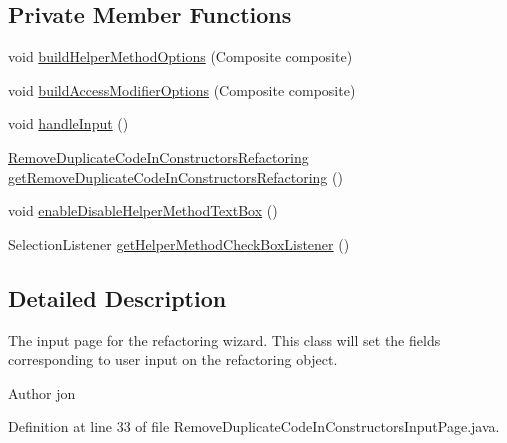 \subsection*{Private Member Functions}
\begin{DoxyCompactItemize}
\item 
void \hyperlink{classedu_1_1illinois_1_1canistelCassabanana_1_1RemoveDuplicateCodeInConstructorsInputPage_a9d523dfb5ee2d5cc7291b443ae27f48e}{buildHelperMethodOptions} (Composite composite)
\item 
void \hyperlink{classedu_1_1illinois_1_1canistelCassabanana_1_1RemoveDuplicateCodeInConstructorsInputPage_a10d164d3a8635fec5038274620a1ad58}{buildAccessModifierOptions} (Composite composite)
\item 
void \hyperlink{classedu_1_1illinois_1_1canistelCassabanana_1_1RemoveDuplicateCodeInConstructorsInputPage_a240da4f4f9c7d6a035752c09e159a0cc}{handleInput} ()
\item 
\hyperlink{classedu_1_1illinois_1_1canistelCassabanana_1_1RemoveDuplicateCodeInConstructorsRefactoring}{RemoveDuplicateCodeInConstructorsRefactoring} \hyperlink{classedu_1_1illinois_1_1canistelCassabanana_1_1RemoveDuplicateCodeInConstructorsInputPage_a90f01a38343d273b9f0e74308fdb50d8}{getRemoveDuplicateCodeInConstructorsRefactoring} ()
\item 
void \hyperlink{classedu_1_1illinois_1_1canistelCassabanana_1_1RemoveDuplicateCodeInConstructorsInputPage_a37c78a173d55c36fcdfeebc22ae670a5}{enableDisableHelperMethodTextBox} ()
\item 
SelectionListener \hyperlink{classedu_1_1illinois_1_1canistelCassabanana_1_1RemoveDuplicateCodeInConstructorsInputPage_a58bda71e4e39f368ec1d1419b2c65825}{getHelperMethodCheckBoxListener} ()
\end{DoxyCompactItemize}


\subsection{Detailed Description}
The input page for the refactoring wizard. This class will set the fields corresponding to user input on the refactoring object.

\begin{DoxyAuthor}{Author}
jon 
\end{DoxyAuthor}


Definition at line 33 of file RemoveDuplicateCodeInConstructorsInputPage.java.



